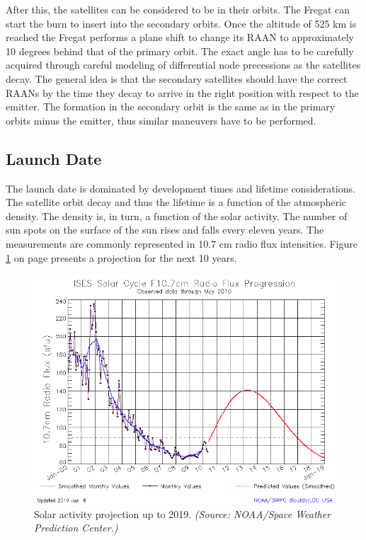 After this, the satellites can be considered to be in their orbits. The Fregat can start the burn to insert into the secondary orbits. Once the altitude of 525 km is reached the Fregat performs a plane shift to change its \ac{RAAN} to approximately 10 degrees behind that of the primary orbit. The exact angle has to be carefully acquired through careful modeling of differential node precessions as the satellites decay. The general idea is that the secondary satellites should have the correct \acp{RAAN} by the time they decay to arrive in the right position with respect to the emitter.  The formation in the secondary orbit is the same as in the primary orbits minus the emitter, thus similar maneuvers have to be performed.

\subsection{Launch Date}
\label{frLSLD}

The launch date is dominated by development times and lifetime considerations. The satellite orbit decay and thus the lifetime is a function of the atmospheric density. The density is, in turn, a function of the solar activity. The number of sun spots on the surface of the sun rises and falls every eleven years. The measurements are commonly represented in 10.7 cm radio flux intensities. Figure \ref{fig:f10.7} on page \pageref{fig:f10.7} presents a projection for the next 10 years.

\begin{figure}[h]
\centering
\includegraphics[width=1\textwidth, angle=0]{chapters/img/solarCycle.png}
\caption{Solar activity projection up to 2019. \emph{(Source: NOAA/Space Weather Prediction Center.)} }
\label{fig:f10.7}
\end{figure}

